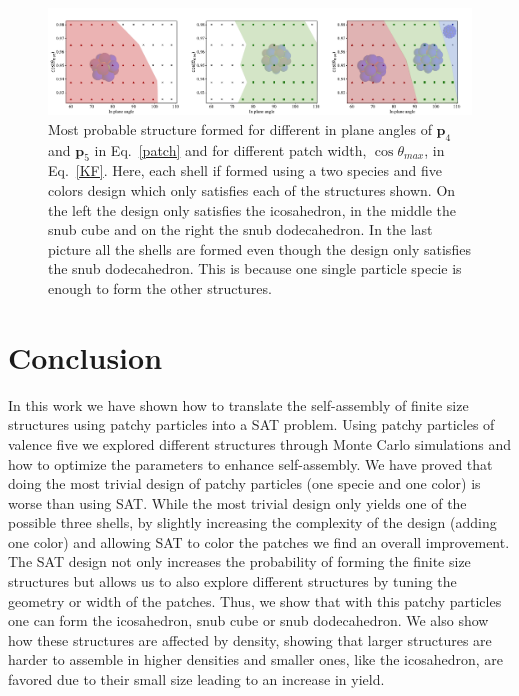 \documentclass[a4paper, amsfonts, amssymb, amsmath, reprint, showkeys, nofootinbib, twoside]{revtex4-1}
\begin{document}
\begin{figure}[t]
	\includegraphics{fig6.pdf}
	\caption{\label{Sol} Most probable structure formed for different in plane angles of $\textbf{p}_4$ and $\textbf{p}_5$ in Eq.~\ref{patch} and for different patch width, $\cos\theta_{max}$, in Eq.~\ref{KF}. Here, each shell if formed using a two species and five colors design which only satisfies each of the structures shown. On the left the design only satisfies the icosahedron, in the middle the snub cube and on the right the snub dodecahedron. In the last picture all the shells are formed even though the design only satisfies the snub dodecahedron. This is because one single particle specie is enough to form the other structures.}
\end{figure}

\section{Conclusion}

In this work we have shown how to translate the self-assembly of finite size structures using patchy particles into a SAT problem. Using patchy particles of valence five we explored different structures through Monte Carlo simulations and how to optimize the parameters to enhance self-assembly. We have proved that doing the most trivial design of patchy particles (one specie and one color) is worse than using SAT. While the most trivial design only yields one of the possible three shells, by slightly increasing the complexity of the design (adding one color) and allowing SAT to color the patches we find an overall improvement. The SAT design not only increases the probability of forming the finite size structures but allows us to also explore different structures by tuning the geometry or width of the patches. Thus, we show that with this patchy particles one can form the icosahedron, snub cube or snub dodecahedron. We also show how these structures are affected by density, showing that larger structures are harder to assemble in higher densities and smaller ones, like the icosahedron, are favored due to their small size leading to an increase in yield.
\end{document}
